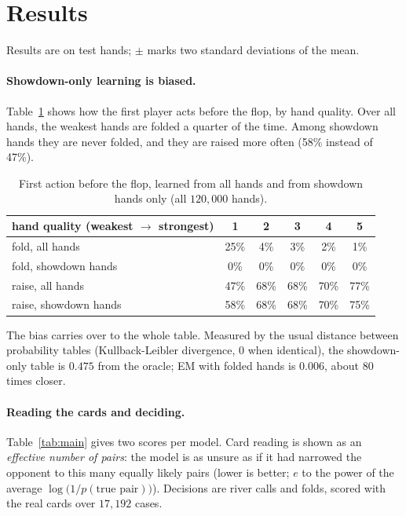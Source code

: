 \documentclass[11pt,a4paper]{article}
\begin{document}
\section{Results}\label{sec:results}

Results are on test hands; $\pm$ marks two standard deviations of the mean.

\paragraph{Showdown-only learning is biased.} Table~\ref{tab:bias} shows how
the first player acts before the flop, by hand quality. Over all hands, the
weakest hands are folded a quarter of the time. Among showdown hands they are
never folded, and they are raised more often (58\% instead of 47\%).

\begin{table}[h]
\centering\small
\begin{tabular}{lccccc}
\toprule
hand quality (weakest $\to$ strongest) & 1 & 2 & 3 & 4 & 5\\
\midrule
fold, all hands          & 25\% & 4\% & 3\% & 2\% & 1\%\\
fold, showdown hands     & 0\%  & 0\% & 0\% & 0\% & 0\%\\
raise, all hands         & 47\% & 68\% & 68\% & 70\% & 77\%\\
raise, showdown hands    & 58\% & 68\% & 68\% & 70\% & 75\%\\
\bottomrule
\end{tabular}
\caption{First action before the flop, learned from all hands and from showdown
hands only (all $120{,}000$ hands).}
\label{tab:bias}
\end{table}

\noindent The bias carries over to the whole table. Measured by the usual
distance between probability tables (Kullback-Leibler divergence, 0 when
identical), the showdown-only table is $0.475$ from the oracle; EM with folded
hands is $0.006$, about 80 times closer.

\paragraph{Reading the cards and deciding.} Table~\ref{tab:main} gives two
scores per model. Card reading is shown as an \emph{effective number of pairs}:
the model is as unsure as if it had narrowed the opponent to this many equally
likely pairs (lower is better; $e$ to the power of the average
$\log\big(1/p(\text{true pair})\big)$). Decisions are river calls and folds, scored with
the real cards over $17{,}192$ cases.
\end{document}
